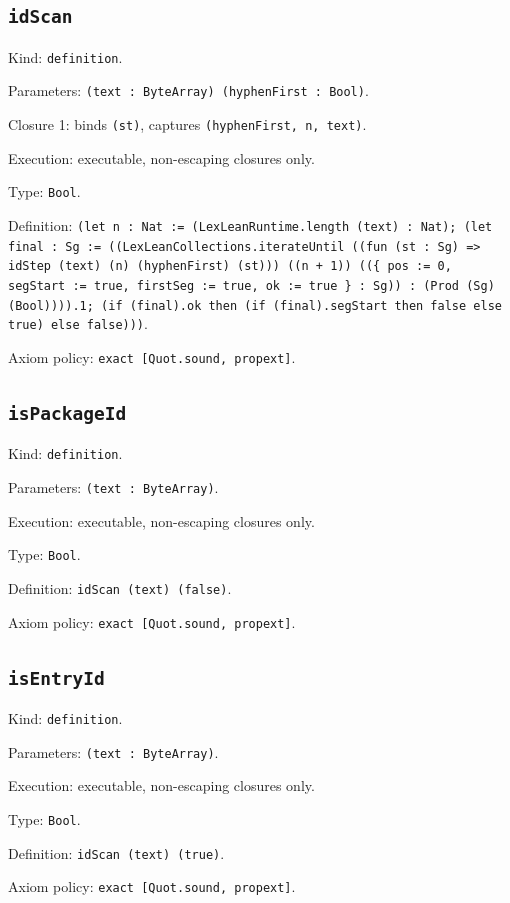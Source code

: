 \documentclass[11pt]{article}
\begin{document}
\subsection*{\texttt{idScan}}
\noindent Kind: \texttt{definition}.\par
\noindent Parameters: \texttt{(text : ByteArray) (hyphenFirst : Bool)}.\par
\noindent Closure 1: binds \texttt{(st)}, captures \texttt{(hyphenFirst, n, text)}.\par
\noindent Execution: executable, non-escaping closures only.\par
\noindent Type: \texttt{Bool}.\par
\noindent Definition: \texttt{(let n : Nat := (LexLeanRuntime.length (text) : Nat); (let final : Sg := ((LexLeanCollections.iterateUntil ((fun (st : Sg) => idStep (text) (n) (hyphenFirst) (st))) ((n + 1)) ((\{ pos := 0, segStart := true, firstSeg := true, ok := true \} : Sg)) : (Prod (Sg) (Bool)))).1; (if (final).ok then (if (final).segStart then false else true) else false)))}.\par
\noindent Axiom policy: \texttt{exact [Quot.sound, propext]}.\par
\subsection*{\texttt{isPackageId}}
\noindent Kind: \texttt{definition}.\par
\noindent Parameters: \texttt{(text : ByteArray)}.\par
\noindent Execution: executable, non-escaping closures only.\par
\noindent Type: \texttt{Bool}.\par
\noindent Definition: \texttt{idScan (text) (false)}.\par
\noindent Axiom policy: \texttt{exact [Quot.sound, propext]}.\par
\subsection*{\texttt{isEntryId}}
\noindent Kind: \texttt{definition}.\par
\noindent Parameters: \texttt{(text : ByteArray)}.\par
\noindent Execution: executable, non-escaping closures only.\par
\noindent Type: \texttt{Bool}.\par
\noindent Definition: \texttt{idScan (text) (true)}.\par
\noindent Axiom policy: \texttt{exact [Quot.sound, propext]}.\par
\end{document}
